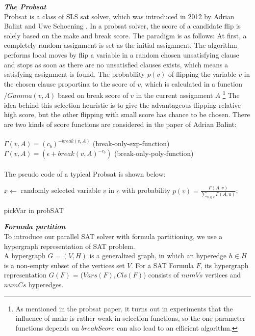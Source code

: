 \documentclass[12pt,a4paper,twoside]{scrartcl}
\numberwithin{equation}{section}
\begin{document}
\emph{\textbf{The Probsat}}\\
Probsat is a class of SLS sat solver, which was introduced in 2012 by Adrian Balint and Uwe Schoening \cite{balint2016engineering}. In a probsat solver, the score of a candidate flip is solely based on the make and break score. The paradigm is as follows: At first, a completely random assignment is set as the initial assignment. The algorithm performs local moves by flip a variable in a random chosen unsatisfying clause and stops as soon as there are no unsatisfied clauses exists, which means a satisfying assignment is found. The probability $p(v)$ of flipping the variable $v$ in the chosen clause proportina to the score of $v$, which is calculated in a function $/Gamma(v,A)$ based on break score of $v$ in the current assignment $A$ \footnote{As mentioned in the probsat paper, it turns out in experiments that the influence of make is rather weak in selection functions, so the one parameter functions depends on $breakScore$ can also lead to an efficient algorithm.} The idea behind this selection heuristic is to give the advantageous flipping relative high score, but the other flipping with small score has chance to be chosen.  There are two kinds of score functions are considered in the paper of Adrian Balint: \\
\\
$\Gamma(v,A) = (c_b)^{-break(v,A)}$ (break-only-exp-function) \\
$\Gamma(v,A)=(\epsilon +break(v,A)^{-c_b})$  (break-only-poly-function)\\ 
\\
The pseudo code of a typical Probsat is shown below:\\
\begin{algorithm}[H]
  $x \leftarrow$ randomly selected  variable $v$ in $c$ with probability $p(v) =\frac{\Gamma(A,v)}{\sum_{u \in c}\Gamma(A,u)}$; 
 \caption{pickVar in probSAT}
\end{algorithm} 
\emph{\textbf{Formula partition}}\\
To introduce our parallel SAT solver with formula partitioning, we use a  hypergraph representation of SAT problem. \\
A hypergraph $G = (V,H)$ is a generalized graph, in which an hyperedge $h \in H$ is a non-empty subset of the vertices set $V$. For a SAT Formula $F$, its hypergraph representation $G(F)$ = ($Vars(F),Cls(F)$) consists of $numVs$ vertices and $numCs$ hyperedges. 
\end{document}
